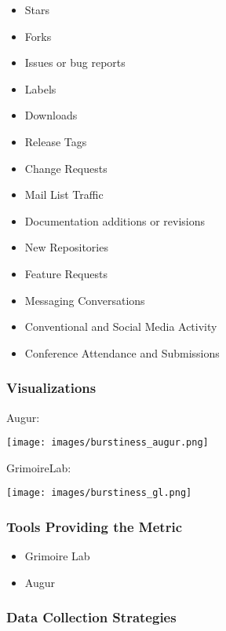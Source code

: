 \documentclass[
  12pt,
]{article}
\providecommand{\tightlist}{%
  \setlength{\itemsep}{0pt}\setlength{\parskip}{0pt}}
\begin{document}
\begin{itemize}
\tightlist
\item
  Stars
\item
  Forks
\item
  Issues or bug reports
\item
  Labels
\item
  Downloads
\item
  Release Tags
\item
  Change Requests
\item
  Mail List Traffic
\item
  Documentation additions or revisions
\item
  New Repositories
\item
  Feature Requests
\item
  Messaging Conversations
\item
  Conventional and Social Media Activity
\item
  Conference Attendance and Submissions
\end{itemize}

\hypertarget{visualizations-2}{%
\subsubsection{Visualizations}\label{visualizations-2}}

Augur:

\texttt{[image: images/burstiness\_augur.png]}

GrimoireLab:

\texttt{[image: images/burstiness\_gl.png]}

\hypertarget{tools-providing-the-metric-1}{%
\subsubsection{Tools Providing the
Metric}\label{tools-providing-the-metric-1}}

\begin{itemize}
\tightlist
\item
  Grimoire Lab
\item
  Augur
\end{itemize}

\hypertarget{data-collection-strategies-2}{%
\subsubsection{Data Collection
Strategies}\label{data-collection-strategies-2}}
\end{document}
